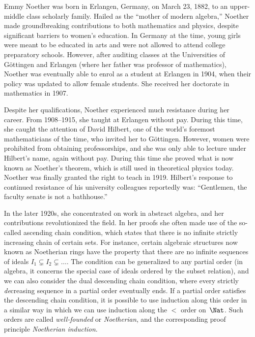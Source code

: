 \documentclass[../../../include/open-logic-section]{subfiles}
\begin{document}



Emmy Noether was born in Erlangen, Germany, on March 23, 1882, to an
upper-middle class scholarly family. Hailed as the ``mother of modern
algebra,'' Noether made groundbreaking contributions to both
mathematics and physics, despite significant barriers to women's
education. In Germany at the time, young girls were meant to be
educated in arts and were not allowed to attend college preparatory
schools.  However, after auditing classes at the Universities of
G\"{o}ttingen and Erlangen (where her father was professor of
mathematics), Noether was eventually able to enrol as a student at
Erlangen in 1904, when their policy was updated to allow female
students. She received her doctorate in mathematics in 1907.

Despite her qualifications, Noether experienced much resistance during
her career. From 1908--1915, she taught at Erlangen without
pay. During this time, she caught the attention of David Hilbert, one
of the world's foremost mathematicians of the time, who invited her to
G\"{o}ttingen. However, women were prohibited from obtaining
professorships, and she was only able to lecture under Hilbert's name,
again without pay. During this time she proved what is now known as
Noether's theorem, which is still used in theoretical physics
today. Noether was finally granted the right to teach in 1919.
Hilbert's response to continued resistance of his university
colleagues reportedly was: ``Gentlemen, the faculty senate is not a
bathhouse.''

In the later 1920s, she concentrated on work in abstract algebra, and
her contributions revolutionized the field.  In her proofs she often
made use of the so-called ascending chain condition, which states that
there is no infinite strictly increasing chain of certain sets. For
instance, certain algebraic structures now known as Noetherian rings
have the property that there are no infinite sequences of ideals $I_1
\subsetneq I_2 \subsetneq \dots$.  The condition can be generalized to
any partial order (in algebra, it concerns the special case of ideals
ordered by the subset relation), and we can also consider the dual
descending chain condition, where every strictly \emph{de}creasing
sequence in a partial order eventually ends.  If a partial order
satisfies the descending chain condition, it is possible to use
induction along this order in a similar way in which we can use
induction along the $<$ order on~$\Nat$.  Such orders are called
\emph{well-founded} or \emph{Noetherian}, and the corresponding proof
principle \emph{Noetherian induction}.
\end{document}
